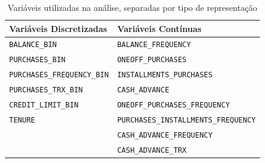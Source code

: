 \documentclass[12pt]{article}
\begin{document}


\begin{table}[h]
    \centering
    \caption{Variáveis utilizadas na análise, separadas por tipo de representação}
    \resizebox{\textwidth}{!}
    {\tiny
        \begin{tabular}{|p{4cm}|p{4cm}|}
            \hline
            \textbf{Variáveis Discretizadas}   & \textbf{Variáveis Contínuas}                \\
            \hline
            \texttt{BALANCE\_BIN}              & \texttt{BALANCE\_FREQUENCY}                 \\
            \texttt{PURCHASES\_BIN}            & \texttt{ONEOFF\_PURCHASES}                  \\
            \texttt{PURCHASES\_FREQUENCY\_BIN} & \texttt{INSTALLMENTS\_PURCHASES}            \\
            \texttt{PURCHASES\_TRX\_BIN}       & \texttt{CASH\_ADVANCE}                      \\
            \texttt{CREDIT\_LIMIT\_BIN}        & \texttt{ONEOFF\_PURCHASES\_FREQUENCY}       \\
            \texttt{TENURE}\footnotemark       & \texttt{PURCHASES\_INSTALLMENTS\_FREQUENCY} \\
                                               & \texttt{CASH\_ADVANCE\_FREQUENCY}           \\
                                               & \texttt{CASH\_ADVANCE\_TRX}                 \\
            \hline
        \end{tabular}
    }
    \label{tab:variaveis_tipo}
\end{table}
\end{document}
